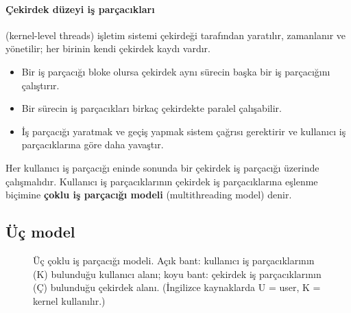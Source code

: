 \documentclass[11pt,a4paper]{article}
\newcommand{\term}[1]{\textbf{\color{mintdeep}#1}}
\begin{document}
\paragraph{Çekirdek düzeyi iş parçacıkları} (kernel-level threads) işletim sistemi çekirdeği tarafından yaratılır, zamanlanır ve yönetilir; her birinin kendi çekirdek kaydı vardır.
\begin{itemize}
  \item[\textcolor{mintdeep}{$+$}] Bir iş parçacığı bloke olursa çekirdek aynı sürecin başka bir iş parçacığını çalıştırır.
  \item[\textcolor{mintdeep}{$+$}] Bir sürecin iş parçacıkları birkaç çekirdekte paralel çalışabilir.
  \item[\textcolor{red!60!black}{$-$}] İş parçacığı yaratmak ve geçiş yapmak sistem çağrısı gerektirir ve kullanıcı iş parçacıklarına göre daha yavaştır.
\end{itemize}

Her kullanıcı iş parçacığı eninde sonunda bir çekirdek iş parçacığı üzerinde çalışmalıdır. Kullanıcı iş parçacıklarının çekirdek iş parçacıklarına eşlenme biçimine \term{çoklu iş parçacığı modeli} (multithreading model) denir.

\subsection{Üç model}

\begin{figure}[H]
\centering
{}
\caption{Üç çoklu iş parçacığı modeli. Açık bant: kullanıcı iş parçacıklarının (K) bulunduğu kullanıcı alanı; koyu bant: çekirdek iş parçacıklarının (Ç) bulunduğu çekirdek alanı. (İngilizce kaynaklarda U = user, K = kernel kullanılır.)}
\end{figure}
\end{document}

